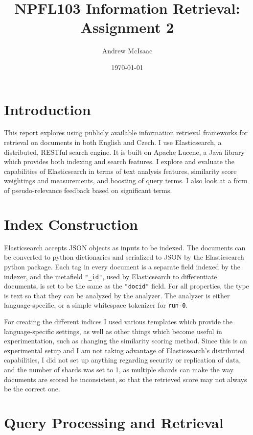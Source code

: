 \documentclass[a4paper]{article}
\title{NPFL103 Information Retrieval: Assignment 2}
\date{\today}
\author{Andrew McIsaac}
\begin{document}
\maketitle

\section{Introduction}
This report explores using publicly available information retrieval frameworks
for retrieval on documents in both English and Czech. I use Elasticsearch, a
distributed, RESTful search engine. It is built on Apache Lucene, a Java library
which provides both indexing and search features. I explore and evaluate the
capabilities of Elasticsearch in terms of text analysis features, similarity
score weightings and measurements, and boosting of query terms. I also look at
a form of pseudo-relevance feedback based on significant terms.

\section{Index Construction}
Elasticsearch accepts JSON objects as inputs to be indexed. The documents can be
converted to python dictionaries and serialized to JSON by the Elasticsearch
python package. Each tag in every document is a separate field indexed by the
indexer, and the metafield \texttt{"\_id"}, used by Elasticsearch to differentiate
documents, is set to be the same as the \texttt{"docid"} field. For all
properties, the type is text so that they can be analyzed by the analyzer. The
analyzer is either language-specific, or a simple whitespace tokenizer for
\texttt{run-0}.

For creating the different indices I used various templates which provide the
language-specific settings, as well as other things which become useful in
experimentation, such as changing the similarity scoring method. Since this is
an experimental setup and I am not taking advantage of Elasticsearch's
distributed capabilities, I did not set up anything regarding security or
replication of data, and the number of shards was set to 1, as multiple shards
can make the way documents are scored be inconsistent, so that the retrieved 
score may not always be the correct one.

\section{Query Processing and Retrieval}
\end{document}

